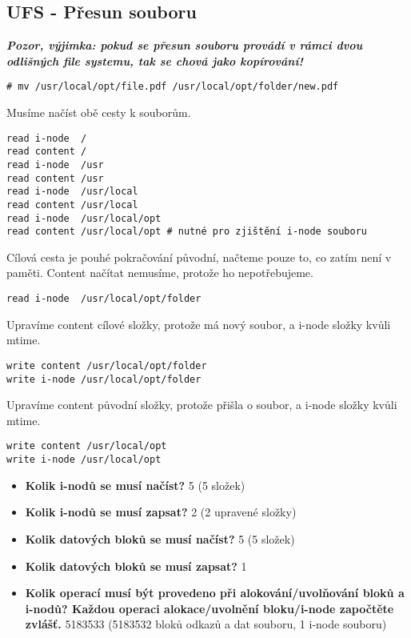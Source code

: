 \subsection{UFS - Přesun souboru}

\textit{\textbf{Pozor, výjimka: pokud se přesun souboru provádí v rámci dvou odlišných file systemu, tak se chová jako kopírování!}}

\begin{verbatim}
# mv /usr/local/opt/file.pdf /usr/local/opt/folder/new.pdf
\end{verbatim}

Musíme načíst obě cesty k souborům.
\begin{verbatim}
read i-node  /
read content /
read i-node  /usr
read content /usr
read i-node  /usr/local
read content /usr/local
read i-node  /usr/local/opt
read content /usr/local/opt # nutné pro zjištění i-node souboru
\end{verbatim}

Cílová cesta je pouhé pokračování původní, načteme pouze to, co zatím není v paměti. Content načítat nemusíme, protože ho nepotřebujeme.
\begin{verbatim}
read i-node  /usr/local/opt/folder
\end{verbatim}

Upravíme content cílové složky, protože má nový soubor, a i-node složky kvůli mtime.
\begin{verbatim}
write content /usr/local/opt/folder
write i-node /usr/local/opt/folder
\end{verbatim}

Upravíme content původní složky, protože přišla o soubor, a i-node složky kvůli mtime.
\begin{verbatim}
write content /usr/local/opt
write i-node /usr/local/opt
\end{verbatim}

\begin{itemize}
    \item \textbf{Kolik i-nodů se musí načíst?} 5 
    (5 složek)
    \item \textbf{Kolik i-nodů se musí zapsat?} 2
    (2 upravené složky)
    \item \textbf{Kolik datových bloků se musí načíst?} 5 
    (5 složek)
    \item \textbf{Kolik datových bloků se musí zapsat?} 1
    \item \textbf{Kolik operací musí být provedeno při alokování/uvolňování bloků a i-nodů? Každou operaci alokace/uvolnění bloku/i-node započtěte zvlášť.} 5183533
    (5183532 bloků odkazů a dat souboru, 1 i-node souboru)
\end{itemize}

